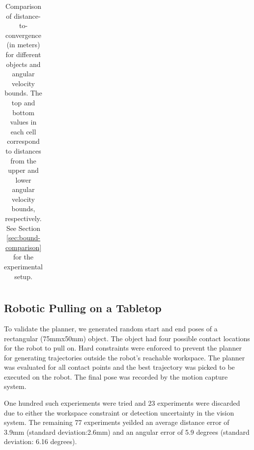 \documentclass[conference]{IEEEtran}
\begin{document}
\begin{table}[t]
\begin{center}
\begin{tabular}[c]{cccc}
        \bottomrule
      \end{tabular}
  \end{center}
  \caption{Comparison of distance-to-convergence (in meters) for different objects and angular velocity bounds. The top and bottom values in each cell correspond to distances from the upper and lower angular velocity bounds, respectively. See Section \ref{sec:bound-comparison} for the experimental setup.}
  \label{table:convergence-distance}
\end{table}

\subsection{Robotic Pulling on a Tabletop}
To validate the planner, we generated random start and end poses of a rectangular (75mmx50mm) object.
The object had four possible contact locations for the robot to pull on.
Hard constraints were enforced to prevent the planner for generating trajectories outside the robot's reachable workspace.  
The planner was evaluated for all contact points and the best trajectory was picked to be executed on the robot. 
The final pose was recorded by the motion capture system.

One hundred such experiements were tried and 23 experiments were discarded due to either the workspace constraint or detection uncertainty in the vision system.
The remaining 77 experiments yeilded an average distance error of 3.9mm (standard deviation:2.6mm) and an angular error of 5.9 degrees (standard deviation: 6.16 degrees).



\end{document}
